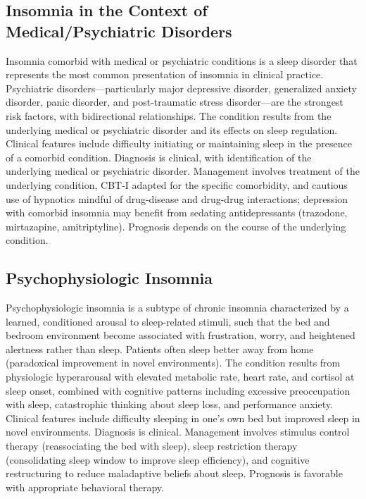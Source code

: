 \subsection{Insomnia in the Context of Medical/Psychiatric Disorders}
\label{sec:Insomnia in the Context of Medical Psychiatric Disorders}
Insomnia comorbid with medical or psychiatric conditions is a sleep disorder that represents the most common presentation of insomnia in clinical practice. Psychiatric disorders---particularly major depressive disorder, generalized anxiety disorder, panic disorder, and post-traumatic stress disorder---are the strongest risk factors, with bidirectional relationships. The condition results from the underlying medical or psychiatric disorder and its effects on sleep regulation. Clinical features include difficulty initiating or maintaining sleep in the presence of a comorbid condition. Diagnosis is clinical, with identification of the underlying medical or psychiatric disorder. Management involves treatment of the underlying condition, CBT-I adapted for the specific comorbidity, and cautious use of hypnotics mindful of drug-disease and drug-drug interactions; depression with comorbid insomnia may benefit from sedating antidepressants (trazodone, mirtazapine, amitriptyline). Prognosis depends on the course of the underlying condition.

\subsection{Psychophysiologic Insomnia}
\label{sec:Psychophysiologic Insomnia}
Psychophysiologic insomnia is a subtype of chronic insomnia characterized by a learned, conditioned arousal to sleep-related stimuli, such that the bed and bedroom environment become associated with frustration, worry, and heightened alertness rather than sleep. Patients often sleep better away from home (paradoxical improvement in novel environments). The condition results from physiologic hyperarousal with elevated metabolic rate, heart rate, and cortisol at sleep onset, combined with cognitive patterns including excessive preoccupation with sleep, catastrophic thinking about sleep loss, and performance anxiety. Clinical features include difficulty sleeping in one's own bed but improved sleep in novel environments. Diagnosis is clinical. Management involves stimulus control therapy (reassociating the bed with sleep), sleep restriction therapy (consolidating sleep window to improve sleep efficiency), and cognitive restructuring to reduce maladaptive beliefs about sleep. Prognosis is favorable with appropriate behavioral therapy.

